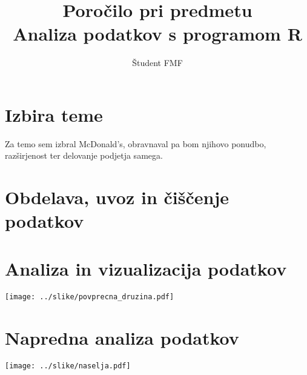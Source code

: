 \documentclass[11pt,a4paper]{article}
\begin{document}
\title{Poročilo pri predmetu \\
Analiza podatkov s programom R}
\author{Študent FMF}
\maketitle

\section{Izbira teme}

Za temo sem izbral McDonald's, obravnaval pa bom njihovo ponudbo, razširjenost ter delovanje podjetja samega.

\section{Obdelava, uvoz in čiščenje podatkov}

\section{Analiza in vizualizacija podatkov}

\texttt{[image: ../slike/povprecna\_druzina.pdf]}

\section{Napredna analiza podatkov}

\texttt{[image: ../slike/naselja.pdf]}
\end{document}
